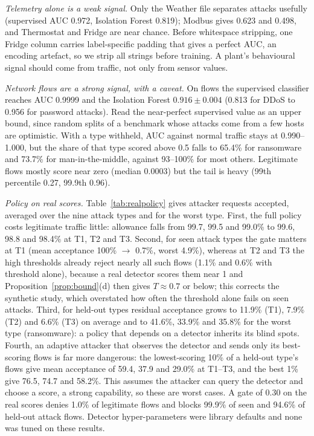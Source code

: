 \emph{Telemetry alone is a weak signal.} Only the Weather file separates attacks usefully (supervised AUC 0.972, Isolation Forest 0.819); Modbus gives 0.623 and 0.498, and Thermostat and Fridge are near chance. Before whitespace stripping, one Fridge column carries label-specific padding that gives a perfect AUC, an encoding artefact, so we strip all strings before training. A plant's behavioural signal should come from traffic, not only from sensor values.

\emph{Network flows are a strong signal, with a caveat.} On flows the supervised classifier reaches AUC 0.9999 and the Isolation Forest $0.916\pm0.004$ (0.813 for DDoS to 0.956 for password attacks). Read the near-perfect supervised value as an upper bound, since random splits of a benchmark whose attacks come from a few hosts are optimistic. With a type withheld, AUC against normal traffic stays at 0.990--1.000, but the share of that type scored above 0.5 falls to 65.4\% for ransomware and 73.7\% for man-in-the-middle, against 93--100\% for most others. Legitimate flows mostly score near zero (median 0.0003) but the tail is heavy (99th percentile 0.27, 99.9th 0.96).

\emph{Policy on real scores.} Table~\ref{tab:realpolicy} gives attacker requests accepted, averaged over the nine attack types and for the worst type. First, the full policy costs legitimate traffic little: allowance falls from 99.7, 99.5 and 99.0\% to 99.6, 98.8 and 98.4\% at T1, T2 and T3. Second, for seen attack types the gate matters at T1 (mean acceptance 100\% $\to$ 0.7\%, worst 4.9\%), whereas at T2 and T3 the high thresholds already reject nearly all such flows (1.1\% and 0.6\% with threshold alone), because a real detector scores them near 1 and Proposition~\ref{prop:bound}(d) then gives $T\approx0.7$ or below; this corrects the synthetic study, which overstated how often the threshold alone fails on seen attacks. Third, for held-out types residual acceptance grows to 11.9\% (T1), 7.9\% (T2) and 6.6\% (T3) on average and to 41.6\%, 33.9\% and 35.8\% for the worst type (ransomware): a policy that depends on a detector inherits its blind spots. Fourth, an adaptive attacker that observes the detector and sends only its best-scoring flows is far more dangerous: the lowest-scoring 10\% of a held-out type's flows give mean acceptance of 59.4, 37.9 and 29.0\% at T1--T3, and the best 1\% give 76.5, 74.7 and 58.2\%. This assumes the attacker can query the detector and choose a score, a strong capability, so these are worst cases. A gate of 0.30 on the real scores denies 1.0\% of legitimate flows and blocks 99.9\% of seen and 94.6\% of held-out attack flows. Detector hyper-parameters were library defaults and none was tuned on these results.

